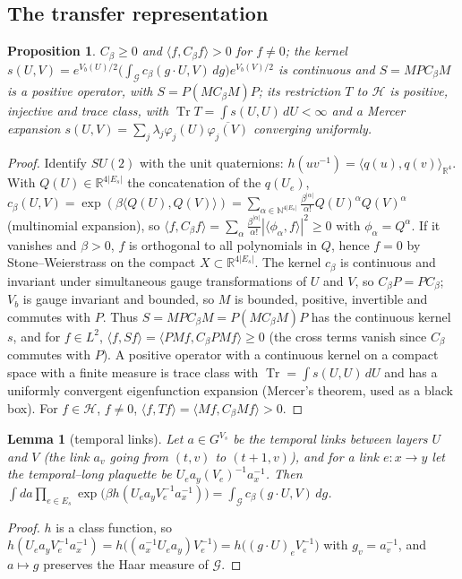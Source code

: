 \documentclass[11pt,a4paper]{article}
\theoremstyle{plain}
\newtheorem{proposition}[theorem]{Proposition}
\newtheorem{lemma}[theorem]{Lemma}
\theoremstyle{definition}
\theoremstyle{remark}
\numberwithin{equation}{section}
\newcommand{\R}{\mathbb{R}}
\newcommand{\N}{\mathbb{N}}
\newcommand{\Tr}{\operatorname{Tr}}
\begin{document}
\subsection{The transfer representation}
\begin{proposition}\label{prop:positive}
$C_\beta\ge0$ and $\langle f,C_\beta f\rangle>0$ for $f\ne0$; the kernel $s(U,V)=e^{V_b(U)/2}\bigl(\int_{\mathcal G}c_\beta(g\cdot U,V)\,dg\bigr)e^{V_b(V)/2}$ is continuous and $S=MPC_\beta M$ is a positive operator, with $S=P(MC_\beta M)P$; its restriction $T$ to $\mathcal H$ is positive, injective and trace class, with $\Tr T=\int s(U,U)\,dU<\infty$ and a Mercer expansion $s(U,V)=\sum_j\lambda_j\varphi_j(U)\overline{\varphi_j(V)}$ converging uniformly.
\end{proposition}
\begin{proof}
Identify $SU(2)$ with the unit quaternions: $h(uv^{-1})=\langle q(u),q(v)\rangle_{\R^4}$. With $Q(U)\in\R^{4|E_s|}$ the concatenation of the $q(U_e)$, $c_\beta(U,V)=\exp(\beta\langle Q(U),Q(V)\rangle)=\sum_{\alpha\in\N^{4|E_s|}}\frac{\beta^{|\alpha|}}{\alpha!}Q(U)^\alpha Q(V)^\alpha$ (multinomial expansion), so $\langle f,C_\beta f\rangle=\sum_\alpha\frac{\beta^{|\alpha|}}{\alpha!}|\langle\phi_\alpha,f\rangle|^2\ge0$ with $\phi_\alpha=Q^\alpha$. If it vanishes and $\beta>0$, $f$ is orthogonal to all polynomials in $Q$, hence $f=0$ by Stone--Weierstrass on the compact $X\subset\R^{4|E_s|}$. The kernel $c_\beta$ is continuous and invariant under simultaneous gauge transformations of $U$ and $V$, so $C_\beta P=PC_\beta$; $V_b$ is gauge invariant and bounded, so $M$ is bounded, positive, invertible and commutes with $P$. Thus $S=MPC_\beta M=P(MC_\beta M)P$ has the continuous kernel $s$, and for $f\in L^2$, $\langle f,Sf\rangle=\langle PMf,C_\beta PMf\rangle\ge0$ (the cross terms vanish since $C_\beta$ commutes with $P$). A positive operator with a continuous kernel on a compact space with a finite measure is trace class with $\Tr=\int s(U,U)\,dU$ and has a uniformly convergent eigenfunction expansion (Mercer's theorem, used as a black box). For $f\in\mathcal H$, $f\ne0$, $\langle f,Tf\rangle=\langle Mf,C_\beta Mf\rangle>0$. 
\end{proof}

\begin{lemma}[temporal links]\label{lem:temporal}
Let $a\in G^{V_s}$ be the temporal links between layers $U$ and $V$ (the link $a_v$ going from $(t,v)$ to $(t{+}1,v)$), and for a link $e:x\to y$ let the temporal--long plaquette be $U_ea_y(V_e)^{-1}a_x^{-1}$. Then $\int da\prod_{e\in E_s}\exp\bigl(\beta h(U_ea_yV_e^{-1}a_x^{-1})\bigr)=\int_{\mathcal G}c_\beta(g\cdot U,V)\,dg$.
\end{lemma}
\begin{proof}
$h$ is a class function, so $h(U_ea_yV_e^{-1}a_x^{-1})=h\bigl((a_x^{-1}U_ea_y)V_e^{-1}\bigr)=h\bigl((g\cdot U)_eV_e^{-1}\bigr)$ with $g_v=a_v^{-1}$, and $a\mapsto g$ preserves the Haar measure of $\mathcal G$.
\end{proof}
\end{document}
